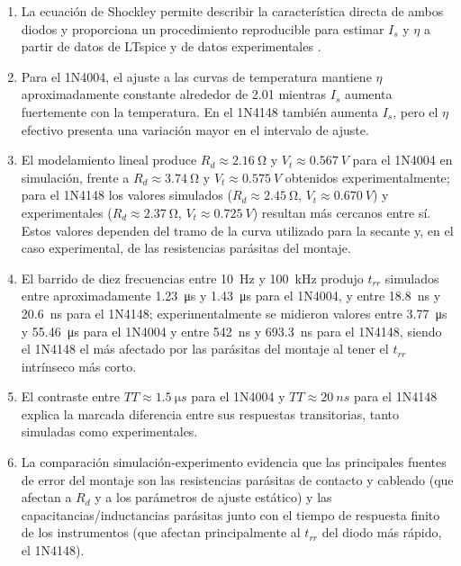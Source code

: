 \documentclass[journal,a4paper]{IEEEtran}
\begin{document}
\begin{enumerate}
    \item La ecuación de Shockley permite describir la característica directa de ambos diodos y proporciona un procedimiento reproducible para estimar $I_s$ y $\eta$ a partir de datos de LTspice y de datos experimentales \cite{sedra}.
    
    \item Para el 1N4004, el ajuste a las curvas de temperatura mantiene $\eta$ aproximadamente constante alrededor de 2.01 mientras $I_s$ aumenta fuertemente con la temperatura. En el 1N4148 también aumenta $I_s$, pero el $\eta$ efectivo presenta una variación mayor en el intervalo de ajuste.
    
    \item El modelamiento lineal produce $R_d\approx\SI{2.16}{\ohm}$ y $V_t\approx\SI{0.567}{V}$ para el 1N4004 en simulación, frente a $R_d\approx\SI{3.74}{\ohm}$ y $V_t\approx\SI{0.575}{V}$ obtenidos experimentalmente; para el 1N4148 los valores simulados ($R_d\approx\SI{2.45}{\ohm}$, $V_t\approx\SI{0.670}{V}$) y experimentales ($R_d\approx\SI{2.37}{\ohm}$, $V_t\approx\SI{0.725}{V}$) resultan más cercanos entre sí. Estos valores dependen del tramo de la curva utilizado para la secante y, en el caso experimental, de las resistencias parásitas del montaje.
    
    \item El barrido de diez frecuencias entre \SI{10}{Hz} y \SI{100}{kHz} produjo $t_{rr}$ simulados entre aproximadamente \SI{1.23}{\micro s} y \SI{1.43}{\micro s} para el 1N4004, y entre \SI{18.8}{ns} y \SI{20.6}{ns} para el 1N4148; experimentalmente se midieron valores entre \SI{3.77}{\micro s} y \SI{55.46}{\micro s} para el 1N4004 y entre \SI{542}{ns} y \SI{693.3}{ns} para el 1N4148, siendo el 1N4148 el más afectado por las parásitas del montaje al tener el $t_{rr}$ intrínseco más corto.
    
    \item El contraste entre $TT\approx\SI{1.5}{\micro s}$ para el 1N4004 y $TT\approx\SI{20}{ns}$ para el 1N4148 explica la marcada diferencia entre sus respuestas transitorias, tanto simuladas como experimentales.

    \item La comparación simulación-experimento evidencia que las principales fuentes de error del montaje son las resistencias parásitas de contacto y cableado (que afectan a $R_d$ y a los parámetros de ajuste estático) y las capacitancias/inductancias parásitas junto con el tiempo de respuesta finito de los instrumentos (que afectan principalmente al $t_{rr}$ del diodo más rápido, el 1N4148).
\end{enumerate}
\end{document}
